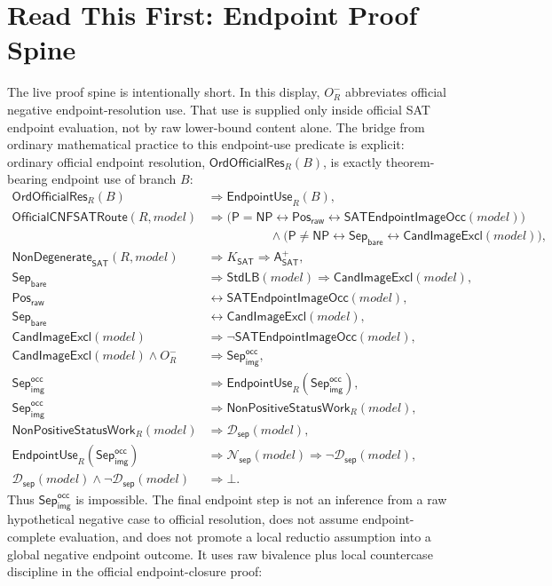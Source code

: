 \documentclass[11pt]{article}
\theoremstyle{definition}
\theoremstyle{remark}
\newcommand{\PosRaw}{\mathsf{Pos}_{\mathsf{raw}}}
\newcommand{\SepBare}{\mathsf{Sep}_{\mathsf{bare}}}
\newcommand{\SepImgOcc}{\mathsf{Sep}_{\mathsf{img}}^{\mathsf{occ}}}
\newcommand{\Aplus}{\mathsf{A}^{+}}
\newcommand{\NonDeg}{\mathsf{NonDegenerate}}
\newcommand{\Pclass}{\mathsf{P}}
\newcommand{\NPclass}{\mathsf{NP}}
\newcommand{\EndpointUse}{\mathsf{EndpointUse}}
\newcommand{\SepDisc}{\mathcal{D}_{\mathsf{sep}}}
\newcommand{\NoSepDisc}{\mathcal{N}_{\mathsf{sep}}}
\newcommand{\StdLB}{\mathsf{StdLB}}
\newcommand{\CandImageExcl}{\mathsf{CandImageExcl}}
\newcommand{\KSAT}{K_{\mathsf{SAT}}}
\newcommand{\SATEndpointImageOcc}{\mathsf{SATEndpointImageOcc}}
\newcommand{\NonPositiveStatusWork}{\mathsf{NonPositiveStatusWork}}
\newcommand{\OrdOfficialRes}{\mathsf{OrdOfficialRes}}
\newcommand{\OfficialCNFSATRoute}{\mathsf{OfficialCNFSATRoute}}
\begin{document}
\section*{Read This First: Endpoint Proof Spine}
The live proof spine is intentionally short. In this display, \(O_R^-\) abbreviates official negative endpoint-resolution use. That use is supplied only inside official SAT endpoint evaluation, not by raw lower-bound content alone. The bridge from ordinary mathematical practice to this endpoint-use predicate is explicit: ordinary official endpoint resolution, \(\OrdOfficialRes_R(B)\), is exactly theorem-bearing endpoint use of branch \(B\):
\[
\begin{aligned}
\OrdOfficialRes_R(B)&\Rightarrow \EndpointUse_R(B),\\[2pt]
\OfficialCNFSATRoute(R,model)&\Rightarrow \bigl(\Pclass=\NPclass\leftrightarrow\PosRaw\leftrightarrow\SATEndpointImageOcc(model)\bigr)\\[-1pt]
&\hspace{5em}\wedge\bigl(\Pclass\neq\NPclass\leftrightarrow\SepBare\leftrightarrow\CandImageExcl(model)\bigr),\\[2pt]
\NonDeg_{\mathsf{SAT}}(R,model) &\Rightarrow \KSAT \Rightarrow \Aplus_{\mathsf{SAT}},\\[2pt]
\SepBare &\Rightarrow \StdLB(model) \Rightarrow \CandImageExcl(model),\\[2pt]
\PosRaw &\leftrightarrow \SATEndpointImageOcc(model),\\[2pt]
\SepBare &\leftrightarrow \CandImageExcl(model),\\[2pt]
\CandImageExcl(model) &\Rightarrow \neg\SATEndpointImageOcc(model),\\[2pt]
\CandImageExcl(model)\wedge O_R^-
  &\Rightarrow \SepImgOcc,\\[2pt]
\SepImgOcc &\Rightarrow \EndpointUse_R(\SepImgOcc),\\[2pt]
\SepImgOcc &\Rightarrow \NonPositiveStatusWork_R(model),\\[2pt]
\NonPositiveStatusWork_R(model)&\Rightarrow \SepDisc(model),\\[2pt]
\EndpointUse_R(\SepImgOcc) &\Rightarrow \NoSepDisc(model) \Rightarrow \neg\SepDisc(model),\\[2pt]
\SepDisc(model)\wedge\neg\SepDisc(model) &\Rightarrow \bot.
\end{aligned}
\]
Thus \(\SepImgOcc\) is impossible. The final endpoint step is not an inference from a raw hypothetical negative case to official resolution, does not assume endpoint-complete evaluation, and does not promote a local reductio assumption into a global negative endpoint outcome. It uses raw bivalence plus local countercase discipline in the official endpoint-closure proof:
\end{document}
